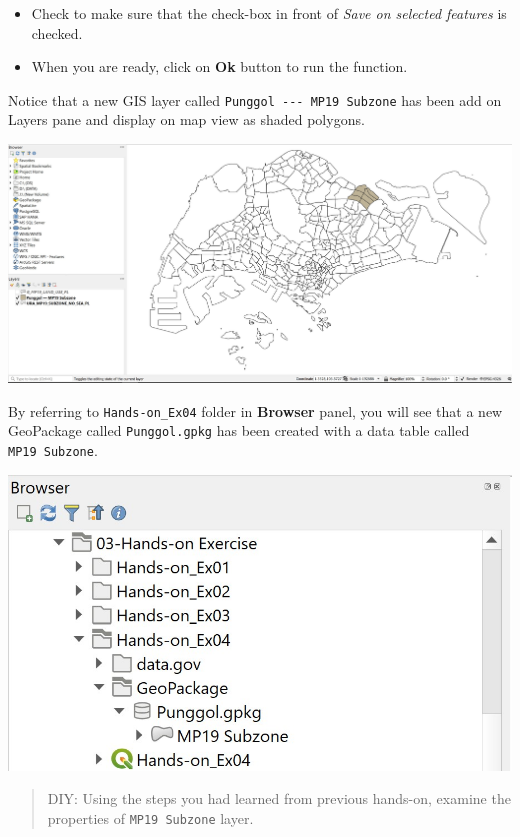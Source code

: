 \documentclass[
  letterpaper,
  DIV=11,
  numbers=noendperiod]{scrreprt}
\begin{document}
\begin{itemize}
\item
  Check to make sure that the check-box in front of \emph{Save on
  selected features} is checked.
\item
  When you are ready, click on \textbf{Ok} button to run the function.
\end{itemize}

Notice that a new GIS layer called
\texttt{Punggol\ -\/-\/-\ MP19\ Subzone} has been add on Layers pane and
display on map view as shaded polygons.

\includegraphics{./img04/image18.jpg}

By referring to \texttt{Hands-on\_Ex04} folder in \textbf{Browser}
panel, you will see that a new GeoPackage called \texttt{Punggol.gpkg}
has been created with a data table called \texttt{MP19\ Subzone}.

\includegraphics{./img04/image19.jpg}

\begin{quote}
DIY: Using the steps you had learned from previous hands-on, examine the
properties of \texttt{MP19\ Subzone} layer.
\end{quote}
\end{document}
